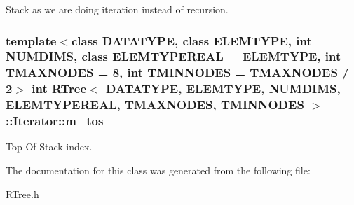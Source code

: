 Stack as we are doing iteration instead of recursion. 

\hypertarget{classRTree_1_1Iterator_aa925698d64e938a5644b4ccdb247fd97}{
\subsubsection[{m\-\_\-tos}]{\setlength{\rightskip}{0pt plus 5cm}template$<$class D\-A\-T\-A\-T\-Y\-P\-E, class E\-L\-E\-M\-T\-Y\-P\-E, int N\-U\-M\-D\-I\-M\-S, class E\-L\-E\-M\-T\-Y\-P\-E\-R\-E\-A\-L = E\-L\-E\-M\-T\-Y\-P\-E, int T\-M\-A\-X\-N\-O\-D\-E\-S = 8, int T\-M\-I\-N\-N\-O\-D\-E\-S = T\-M\-A\-X\-N\-O\-D\-E\-S / 2$>$ int {\bf R\-Tree}$<$ D\-A\-T\-A\-T\-Y\-P\-E, E\-L\-E\-M\-T\-Y\-P\-E, N\-U\-M\-D\-I\-M\-S, E\-L\-E\-M\-T\-Y\-P\-E\-R\-E\-A\-L, T\-M\-A\-X\-N\-O\-D\-E\-S, T\-M\-I\-N\-N\-O\-D\-E\-S $>$\-::Iterator\-::m\-\_\-tos\hspace{0.3cm}{\ttfamily [private]}}}\label{classRTree_1_1Iterator_aa925698d64e938a5644b4ccdb247fd97}


Top Of Stack index. 



The documentation for this class was generated from the following file\-:\begin{DoxyCompactItemize}
\item 
\hyperlink{RTree_8h}{R\-Tree.\-h}\end{DoxyCompactItemize}
